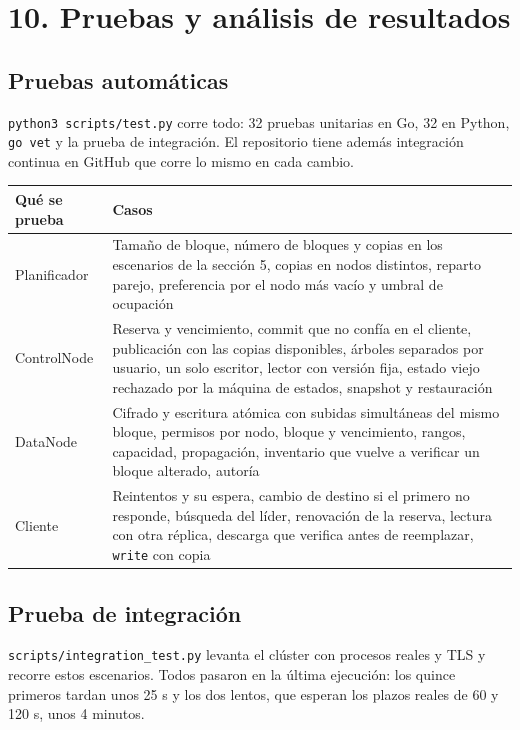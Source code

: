 \documentclass[10pt]{article}
\begin{document}
\separador

\section{10. Pruebas y análisis de resultados}

\subsection{Pruebas automáticas}

\texttt{python3 scripts/test.py} corre todo: 32 pruebas unitarias en Go, 32 en Python, \texttt{go vet} y la prueba de integración. El repositorio tiene además integración continua en GitHub que corre lo mismo en cada cambio.

\begin{xltabular}{\linewidth}{@{}L{3.4cm}Y@{}}
\toprule
Qué se prueba & Casos \\
\midrule\endhead
Planificador & Tamaño de bloque, número de bloques y copias en los escenarios de la sección 5, copias en nodos distintos, reparto parejo, preferencia por el nodo más vacío y umbral de ocupación \\
ControlNode & Reserva y vencimiento, commit que no confía en el cliente, publicación con las copias disponibles, árboles separados por usuario, un solo escritor, lector con versión fija, estado viejo rechazado por la máquina de estados, snapshot y restauración \\
DataNode & Cifrado y escritura atómica con subidas simultáneas del mismo bloque, permisos por nodo, bloque y vencimiento, rangos, capacidad, propagación, inventario que vuelve a verificar un bloque alterado, autoría \\
Cliente & Reintentos y su espera, cambio de destino si el primero no responde, búsqueda del líder, renovación de la reserva, lectura con otra réplica, descarga que verifica antes de reemplazar, \texttt{write} con copia \\
\bottomrule
\end{xltabular}

\subsection{Prueba de integración}

\texttt{scripts/integration\_test.py} levanta el clúster con procesos reales y TLS y recorre estos escenarios. Todos pasaron en la última ejecución: los quince primeros tardan unos 25 s y los dos lentos, que esperan los plazos reales de 60 y 120 s, unos 4 minutos.
\end{document}
